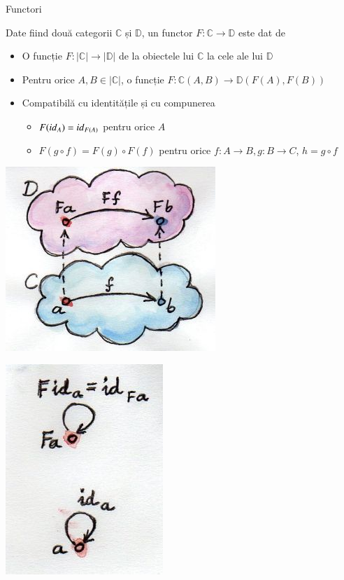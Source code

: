 \documentclass[xcolor=pdftex,romanian,colorlinks]{beamer}
\begin{document}
\begin{frame}{Functori}{}

Date fiind două categorii $\mathbb{C}$ și $\mathbb{D}$, un functor $F : \mathbb{C} \rightarrow \mathbb{D}$ este dat de
\begin{itemize}
\item O funcție $F : |\mathbb{C}| \rightarrow |\mathbb{D}|$ de la obiectele lui $\mathbb{C}$ la cele ale lui $\mathbb{D}$
\item Pentru orice $A,B \in |\mathbb{C}|$, o funcție $F : \mathbb{C}(A,B) \rightarrow \mathbb{D}(F(A),F(B))$
\item Compatibilă cu identitățile și cu compunerea
\begin{itemize}
\item $F({\it id}_A) = {\it id}_{F(A)}$ pentru orice $A$
\item $F(g\circ f) = F(g)\circ F(f)$ pentru orice $f : A \rightarrow B,g: B \rightarrow C$, $h = g\circ f$
\end{itemize}
\end{itemize}
\vfill
\begin{minipage}{.24\columnwidth}
\includegraphics[scale=.5]{functor}
\end{minipage}
\begin{minipage}{.24\columnwidth}
\includegraphics[scale=.5]{functorid}

\end{minipage}
\end{frame}
\end{document}
